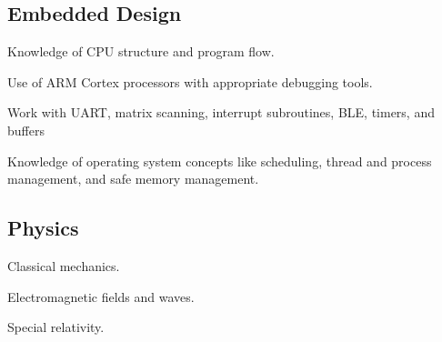 \documentclass[]{deedy-resume-openfont}
\begin{document}
\begin{minipage}[t]{0.4\textwidth}
\begin{tightemize}
\end{tightemize}
\sectionsep

\subsection{Embedded Design}
\vspace*{\topsep} %
\begin{tightemize}
\item Knowledge of CPU structure and program flow.
\item Use of ARM Cortex processors with appropriate debugging tools.
\item Work with UART, matrix scanning, interrupt subroutines, BLE, timers, and buffers
\item Knowledge of operating system concepts like scheduling, thread and process management, and safe memory management.
\end{tightemize}
\sectionsep

\subsection{Physics}
\vspace*{\topsep} %
\begin{tightemize}
\item Classical mechanics.
\item Electromagnetic fields and waves.
\item Special relativity.
\end{tightemize}

%
%

\end{minipage} 
\hfill
\end{document}

